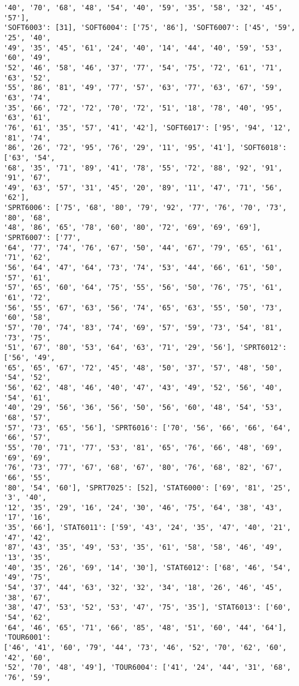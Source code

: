 \documentclass[11pt]{article}
\begin{document}
\begin{Verbatim}[commandchars=\\\{\}]
'40', '70', '68', '48', '54', '40', '59', '35', '58', '32', '45', '57'],
'SOFT6003': [31], 'SOFT6004': ['75', '86'], 'SOFT6007': ['45', '59', '25', '40',
'49', '35', '45', '61', '24', '40', '14', '44', '40', '59', '53', '60', '49',
'52', '46', '58', '46', '37', '77', '54', '75', '72', '61', '71', '63', '52',
'55', '86', '81', '49', '77', '57', '63', '77', '63', '67', '59', '63', '74',
'35', '66', '72', '72', '70', '72', '51', '18', '78', '40', '95', '63', '61',
'76', '61', '35', '57', '41', '42'], 'SOFT6017': ['95', '94', '12', '81', '74',
'86', '26', '72', '95', '76', '29', '11', '95', '41'], 'SOFT6018': ['63', '54',
'68', '35', '71', '89', '41', '78', '55', '72', '88', '92', '91', '91', '67',
'49', '63', '57', '31', '45', '20', '89', '11', '47', '71', '56', '62'],
'SPRT6006': ['75', '68', '80', '79', '92', '77', '76', '70', '73', '80', '68',
'48', '86', '65', '78', '60', '80', '72', '69', '69', '69'], 'SPRT6007': ['77',
'64', '77', '74', '76', '67', '50', '44', '67', '79', '65', '61', '71', '62',
'56', '64', '47', '64', '73', '74', '53', '44', '66', '61', '50', '57', '61',
'57', '65', '60', '64', '75', '55', '56', '50', '76', '75', '61', '61', '72',
'56', '55', '67', '63', '56', '74', '65', '63', '55', '50', '73', '60', '58',
'57', '70', '74', '83', '74', '69', '57', '59', '73', '54', '81', '73', '75',
'51', '67', '80', '53', '64', '63', '71', '29', '56'], 'SPRT6012': ['56', '49',
'65', '65', '67', '72', '45', '48', '50', '37', '57', '48', '50', '54', '52',
'56', '62', '48', '46', '40', '47', '43', '49', '52', '56', '40', '54', '61',
'40', '29', '56', '36', '56', '50', '56', '60', '48', '54', '53', '68', '57',
'57', '73', '65', '56'], 'SPRT6016': ['70', '56', '66', '66', '64', '66', '57',
'55', '70', '71', '77', '53', '81', '65', '76', '66', '48', '69', '69', '69',
'76', '73', '77', '67', '68', '67', '80', '76', '68', '82', '67', '66', '55',
'80', '54', '60'], 'SPRT7025': [52], 'STAT6000': ['69', '81', '25', '3', '40',
'12', '35', '29', '16', '24', '30', '46', '75', '64', '38', '43', '17', '16',
'35', '66'], 'STAT6011': ['59', '43', '24', '35', '47', '40', '21', '47', '42',
'87', '43', '35', '49', '53', '35', '61', '58', '58', '46', '49', '13', '35',
'40', '35', '26', '69', '14', '30'], 'STAT6012': ['68', '46', '54', '49', '75',
'54', '37', '44', '63', '32', '32', '34', '18', '26', '46', '45', '38', '67',
'38', '47', '53', '52', '53', '47', '75', '35'], 'STAT6013': ['60', '54', '62',
'64', '46', '65', '71', '66', '85', '48', '51', '60', '44', '64'], 'TOUR6001':
['46', '41', '60', '79', '44', '73', '46', '52', '70', '62', '60', '42', '60',
'52', '70', '48', '49'], 'TOUR6004': ['41', '24', '44', '31', '68', '76', '59',

\end{Verbatim}
\end{document}
